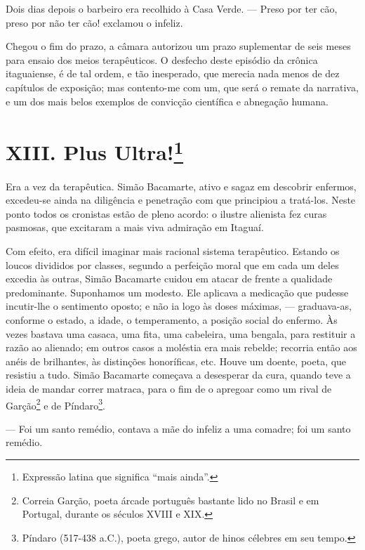 Dois dias depois o barbeiro era recolhido à Casa Verde. --- Preso por
ter cão, preso por não ter cão! exclamou o infeliz.

Chegou o fim do prazo, a câmara autorizou um prazo suplementar de seis
meses para ensaio dos meios terapêuticos. O desfecho deste episódio da
crônica itaguaiense, é de tal ordem, e tão inesperado, que merecia nada
menos de dez capítulos de exposição; mas contento-me com um, que será o
remate da narrativa, e um dos mais belos exemplos de convicção
científica e abnegação humana.

\chapter{XIII. Plus Ultra!\footnote{Expressão latina que significa ``mais
  ainda''.}}

Era a vez da terapêutica. Simão Bacamarte, ativo e sagaz em descobrir
enfermos, excedeu-se ainda na diligência e penetração com que principiou
a tratá-los. Neste ponto todos os cronistas estão de pleno acordo: o
ilustre alienista fez curas pasmosas, que excitaram a mais viva
admiração em Itaguaí.

Com efeito, era difícil imaginar mais racional sistema terapêutico.
Estando os loucos divididos por classes, segundo a perfeição moral que
em cada um deles excedia às outras, Simão Bacamarte cuidou em atacar de
frente a qualidade predominante. Suponhamos um modesto. Ele aplicava a
medicação que pudesse incutir-lhe o sentimento oposto; e não ia logo às
doses máximas, --- graduava-as, conforme o estado, a idade, o
temperamento, a posição social do enfermo. Às vezes bastava uma casaca,
uma fita, uma cabeleira, uma bengala, para restituir a razão ao
alienado; em outros casos a moléstia era mais rebelde; recorria então
aos anéis de brilhantes, às distinções honoríficas, etc. Houve um
doente, poeta, que resistiu a tudo. Simão Bacamarte começava a
desesperar da cura, quando teve a ideia de mandar correr matraca, para o
fim de o apregoar como um rival de Garção\footnote{Correia Garção, poeta
  árcade português bastante lido no Brasil e em Portugal, durante os
  séculos XVIII e XIX.} e de Píndaro\footnote{Píndaro (517-438 a.C.),
  poeta grego, autor de hinos célebres em seu tempo.}.

--- Foi um santo remédio, contava a mãe do infeliz a uma comadre; foi um
santo remédio.


